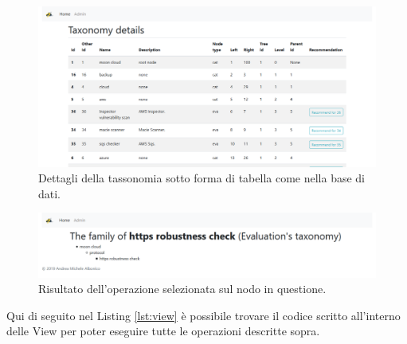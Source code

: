%
\begin{figure}
    \includegraphics[scale=0.3]{images/MCRS_taxdetails.png}
    \caption{Dettagli della tassonomia sotto forma di tabella come nella base di dati.}
    \label{fig:MCRS_taxdetails}
\end{figure}
%
\begin{figure}
    \includegraphics[scale=0.3]{images/MCRS_taxnodedetails.png}
    \caption{Risultato dell'operazione selezionata sul nodo in questione.}
    \label{fig:MCRS_taxnodedetails}
\end{figure}
%
\newpage
%
\hfill\break
Qui di seguito nel Listing \ref{lst:view} è possibile trovare il codice scritto all'interno delle View per poter eseguire tutte le 
operazioni descritte sopra.
\lstset{style=python_code_style}
\label{lst:view}
